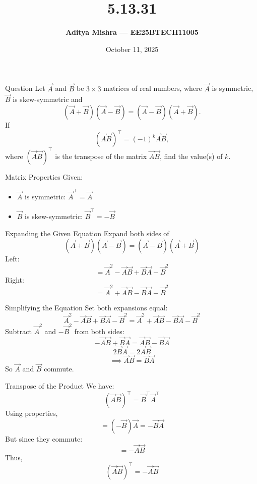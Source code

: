 \documentclass{beamer}
\title{\textbf{5.13.31}}
\author{\textbf{Aditya Mishra — EE25BTECH11005}}
\date{October 11, 2025}
\begin{document}
\begin{frame}
\titlepage
\end{frame}

\begin{frame}{Question}
Let \(\vec{A}\) and \(\vec{B}\) be \(3 \times 3\) matrices of real numbers, where \(\vec{A}\) is symmetric, \(\vec{B}\) is skew-symmetric and 
\[
(\vec{A} + \vec{B})(\vec{A} - \vec{B}) = (\vec{A} - \vec{B})(\vec{A} + \vec{B}).
\]
If 
\[
(\vec{A}\vec{B})^\top = (-1)^k \vec{A}\vec{B},
\]
where \((\vec{A}\vec{B})^\top\) is the transpose of the matrix \(\vec{A}\vec{B}\), find the value(s) of \(k\).
\end{frame}

\begin{frame}{Matrix Properties}
Given:
\begin{itemize}
    \item \(\vec{A}\) is symmetric: \(\vec{A}^\top = \vec{A}\)
    \item \(\vec{B}\) is skew-symmetric: \(\vec{B}^\top = -\vec{B}\)
\end{itemize}
\end{frame}

\begin{frame}{Expanding the Given Equation}
Expand both sides of 
\[
(\vec{A} + \vec{B})(\vec{A} - \vec{B}) = (\vec{A} - \vec{B})(\vec{A} + \vec{B})
\]
Left:
\[
= \vec{A}^2 - \vec{A}\vec{B} + \vec{B}\vec{A} - \vec{B}^2
\]
Right:
\[
= \vec{A}^2 + \vec{A}\vec{B} - \vec{B}\vec{A} - \vec{B}^2
\]
\end{frame}

\begin{frame}{Simplifying the Equation}
Set both expansions equal:
\[
\vec{A}^2 - \vec{A}\vec{B} + \vec{B}\vec{A} - \vec{B}^2 = \vec{A}^2 + \vec{A}\vec{B} - \vec{B}\vec{A} - \vec{B}^2
\]
Subtract \(\vec{A}^2\) and \(-\vec{B}^2\) from both sides:
\[
- \vec{A}\vec{B} + \vec{B}\vec{A} = \vec{A}\vec{B} - \vec{B}\vec{A}
\]
\[
2\vec{B}\vec{A} = 2\vec{A}\vec{B}
\]
\[
\implies \vec{A}\vec{B} = \vec{B}\vec{A}
\]
So \(\vec{A}\) and \(\vec{B}\) commute.
\end{frame}

\begin{frame}{Transpose of the Product}
We have:
\[
(\vec{A}\vec{B})^\top = \vec{B}^\top\vec{A}^\top
\]
Using properties,
\[
= (-\vec{B})\vec{A} = -\vec{B}\vec{A}
\]
But since they commute:
\[
= -\vec{A}\vec{B}
\]
Thus,
\[
(\vec{A}\vec{B})^\top = -\vec{A}\vec{B}
\]
\end{frame}
\end{document}
